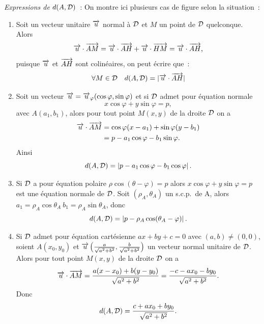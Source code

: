 \emph{Expressions de \(d(A , \mathcal{D})\)}~:
On montre ici plusieurs cas de figure selon la situation~:
\begin{enumerate}
  \item Soit un vecteur unitaire \(\overrightarrow{u}\) normal à \(\mathcal{D}\) et \(M\) un point de 
    \(\mathcal{D}\) quelconque. Alors
    \begin{equation}
      \overrightarrow{u} \cdot \overrightarrow{AM} = \overrightarrow{u} \cdot \overrightarrow{AH} + \overrightarrow{u} \cdot \overrightarrow{HM} = \overrightarrow{u} 
      \cdot \overrightarrow{AH},
    \end{equation}
    puisque \(\overrightarrow{u}\) et \(\overrightarrow{AH}\) sont colinéaires, on peut écrire que~:
    \begin{equation}
      \forall M \in \mathcal{D} \quad d(A , \mathcal{D}) = |\overrightarrow{u} \cdot \overrightarrow{AH}|
    \end{equation}
  \item Soit un vecteur \(\overrightarrow{u} = \overrightarrow{u}_\varphi(\cos \varphi, \sin \varphi)\) et 
    si \(\mathcal{D}\) admet pour équation normale
    \begin{equation}
      x \cos \varphi + y \sin \varphi = p,
    \end{equation}
    avec \(A(a_1 , b_1)\), alors pour tout point \(M(x , y)\) de la droite 
    \(\mathcal{D}\) on a
    \begin{align}
      \overrightarrow{u} \cdot \overrightarrow{AM} &= \cos \varphi (x - a_1) + \sin \varphi (y - b_1)\\
                          &= p - a_1\cos\varphi -b_1\sin\varphi.
    \end{align}
    Ainsi
    \begin{equation}
      d(A , \mathcal{D}) = \left\lvert p - a_1\cos\varphi - b_1\cos\varphi\right\rvert.
    \end{equation}
  \item Si \(\mathcal{D}\) a pour équation polaire \(\rho\cos(\theta - \varphi) = p\) 
    alors \(x \cos \varphi + y \sin \varphi = p\) est une équation normale de 
    \(\mathcal{D}\). Soit \((\rho_A , \theta_A)\) un s.c.p.\ de A, alors \(a_1 = 
    \rho_A\cos\theta_A \ b_1 = \rho_A\sin\theta_A\), donc
    \begin{equation}
      d(A , \mathcal{D}) = \left\lvert p - \rho_A\cos(\theta_A - \varphi)\right\rvert.
    \end{equation}
  \item Si \(\mathcal{D}\) admet pour équation cartésienne \(ax + by + c = 0\) avec 
    \((a , b) \neq (0 , 0)\), soient \(A(x_0 , y_0)\) et \(\overrightarrow{u} 
    \left(\frac{a}{\sqrt{a^2 + b^2}}, \frac{b}{\sqrt{a^2 + b^2}}\right)\) un 
    vecteur normal unitaire de \(\mathcal{D}\). Alors pour tout point \(M(x , y)\) de 
    la droite \(\mathcal{D}\) on a
    \begin{equation}
      \overrightarrow{u}\cdot\overrightarrow{AM} = \frac{a(x - x_0) + b(y - y_0)}{\sqrt{a^2 + b^2}} = 
      \frac{-c - ax_0 - by_0}{\sqrt{a^2 + b^2}}.
    \end{equation}
    Donc
    \begin{equation}
      d(A , \mathcal{D}) = \frac{c + ax_0 + by_0}{\sqrt{a^2 + b^2}}.
    \end{equation}
\end{enumerate}

